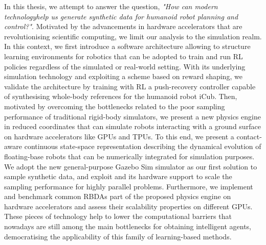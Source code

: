 \begin{addmargin}{-6mm}
In this thesis, we attempt to answer the question,
\textit{"How can modern technology\linebreak help us generate synthetic data for humanoid robot planning and control?"}.\linebreak
Motivated by the advancements in hardware accelerators that are revolutionising scientific computing, we limit our analysis to the simulation realm.\linebreak
In this context, we first introduce a software architecture allowing to structure learning environments for robotics that can be adopted to train and run \ac{RL} policies regardless of the simulated or real-world setting.
With its underlying simulation technology and exploiting a scheme based on reward shaping, we validate the architecture by
training with \ac{RL} a push-recovery controller capable of synthesising whole-body references for the humanoid robot iCub.
Then, motivated by overcoming the bottlenecks related to the poor sampling performance of traditional rigid-body simulators, we present a new physics engine in reduced coordinates that can simulate robots interacting with a ground surface on hardware accelerators like \acp{GPU} and \acp{TPU}.
To this end, we present a contact-aware continuous state-space representation describing the dynamical evolution of floating-base robots that can be numerically integrated for simulation purposes.
We adopt the new general-purpose Gazebo Sim simulator as our first solution to sample synthetic data, and exploit \jax and its hardware support to scale the sampling performance for highly parallel problems.
Furthermore, we implement and benchmark common \acp{RBDA} part of the proposed physics engine on hardware accelerators and assess their scalability properties on different \acp{GPU}.
These pieces of technology help to lower the computational barriers that nowadays are still among the main bottlenecks for obtaining intelligent agents, democratising the applicability of this family of learning-based methods.

\end{addmargin}

\vfill

\endgroup

\vfill
